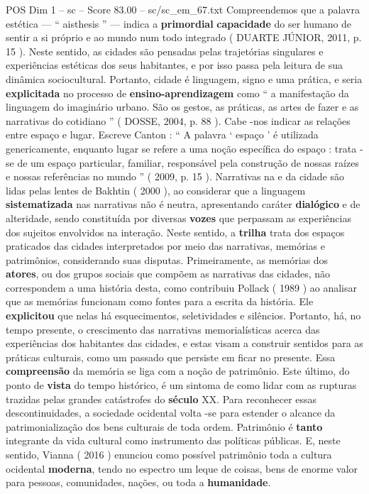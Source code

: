 \begin{textsample}{POS Dim 1 – sc – Score 83.00 – sc/sc\_em\_67.txt}
Compreendemos que a palavra estética — “ aisthesis ” — indica a \textbf{primordial} \textbf{capacidade} do ser humano de sentir a si próprio e ao mundo num todo integrado ( DUARTE JÚNIOR, 2011, p. 15 ).
Neste sentido, as cidades são pensadas pelas trajetórias singulares e experiências estéticas dos seus habitantes, e por isso passa pela leitura de sua dinâmica sociocultural.
Portanto, cidade é linguagem, signo e uma prática, e seria \textbf{explicitada} no processo de \textbf{ensino-aprendizagem} como “ a manifestação da linguagem do imaginário urbano.
São os gestos, as práticas, as artes de fazer e as narrativas do cotidiano ” ( DOSSE, 2004, p. 88 ).
Cabe -nos indicar as relações entre espaço e lugar.
Escreve Canton : “ A palavra ‘ espaço ’ é utilizada genericamente, enquanto lugar se refere a uma noção específica do espaço : trata -se de um espaço particular, familiar, responsável pela construção de nossas raízes e nossas referências no mundo ” ( 2009, p. 15 ).
Narrativas na e da cidade são lidas pelas lentes de Bakhtin ( 2000 ), ao considerar que a linguagem \textbf{sistematizada} nas narrativas não é neutra, apresentando caráter \textbf{dialógico} e de alteridade, sendo constituída por diversas \textbf{vozes} que perpassam as experiências dos sujeitos envolvidos na interação.
Neste sentido, a \textbf{trilha} trata dos espaços praticados das cidades interpretados por meio das narrativas, memórias e patrimônios, considerando suas disputas.
Primeiramente, as memórias dos \textbf{atores}, ou dos grupos sociais que compõem as narrativas das cidades, não correspondem a uma história desta, como contribuiu Pollack ( 1989 ) ao analisar que as memórias funcionam como fontes para a escrita da história.
Ele \textbf{explicitou} que nelas há esquecimentos, seletividades e silêncios.
Portanto, há, no tempo presente, o crescimento das narrativas memorialísticas acerca das experiências dos habitantes das cidades, e estas visam a construir sentidos para as práticas culturais, como um passado que persiste em ficar no presente.
Essa \textbf{compreensão} da memória se liga com a noção de patrimônio.
Este último, do ponto de \textbf{vista} do tempo histórico, é um sintoma de como lidar com as rupturas trazidas pelas grandes catástrofes do \textbf{século} XX.
Para reconhecer essas descontinuidades, a sociedade ocidental volta -se para estender o alcance da patrimonialização dos bens culturais de toda ordem.
Patrimônio é \textbf{tanto} integrante da vida cultural como instrumento das políticas públicas.
E, neste sentido, Vianna ( 2016 ) enunciou como possível patrimônio toda a cultura ocidental \textbf{moderna}, tendo no espectro um leque de coisas, bens de enorme valor para pessoas, comunidades, nações, ou toda a \textbf{humanidade}.

\end{textsample}
